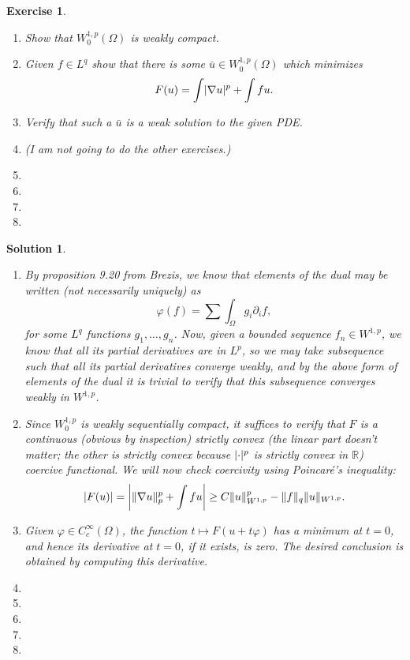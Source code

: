 \documentclass{article}
\newtheorem{ex}{Exercise}
\theoremstyle{nonumberplain}
\newtheorem{sol}{Solution}
\newcommand{\R}{\mathbb{R}}
\newcommand{\grad}{\nabla}
\DeclarePairedDelimiter{\abs}{\lvert}{\rvert}
\DeclarePairedDelimiter{\Norm}{\lVert}{\rVert}
\begin{document}
\begin{ex}
\leavevmode
\begin{enumerate}
\item Show that $W^{1,p}_0(\Omega)$ is weakly compact.
\item Given $f \in L^q$ show that there is some $\bar u \in W^{1,p}_0(\Omega)$ which minimizes
\begin{equation}
F(u) = \int \abs{\grad u}^p + \int f u.
\end{equation}
\item Verify that such a $\bar u$ is a weak solution to the given PDE.
\item (I am not going to do the other exercises.)
\item
\item
\item
\item
\end{enumerate}
\end{ex}

\begin{sol}
\leavevmode
\begin{enumerate}
\item By proposition 9.20 from Brezis, we know that elements of the dual may be written (not necessarily uniquely) as
\begin{equation}
\varphi(f) = \sum \int_\Omega g_i \partial_i f,
\end{equation}
for some $L^q$ functions $g_1, \dots, g_n$. Now, given a bounded sequence $f_n \in W^{1,p}$, we know that all its partial derivatives are in $L^p$, so we may take subsequence such that all its partial derivatives converge weakly, and by the above form of elements of the dual it is trivial to verify that this subsequence converges weakly in $W^{1,p}$.

\item Since $W^{1,p}_0$ is weakly sequentially compact, it suffices to verify that $F$ is a continuous (obvious by inspection) strictly convex (the linear part doesn't matter; the other is strictly convex because $\abs{\cdot}^p$ is strictly convex in $\R$) coercive functional. We will now check coercivity using Poincaré's inequality:
\begin{equation}
\abs{F(u)} = \abs*{\Norm{\grad u}_p^p + \int f u} \geq C \Norm{u}_{W^{1,p}}^p - \Norm{f}_q \Norm{u}_{W^{1,p}}.
\end{equation}

\item Given $\varphi \in C^\infty_c(\Omega)$, the function $t \mapsto F(u+t \varphi)$ has a minimum at $t=0$, and hence its derivative at $t=0$, if it exists, is zero. The desired conclusion is obtained by computing this derivative.

\item
\item
\item
\item
\item
\end{enumerate}
\end{sol}
\end{document}
